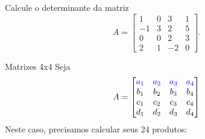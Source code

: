 \begin{frame}{}
\begin{exer}
Calcule o determinante da matriz 
\[
A=\begin{bmatrix}
 1 & 0 & 3 & 1 \\ -1 & 3 & 2 & 5 \\ 	0 & 0 & 2  & 3\\ 2 & 1 & -2 & 0
\end{bmatrix}.
\]
\end{exer}
\end{frame}

\begin{frame}[label=determinantes]{Matrizes 4x4}
Seja
\[
A=\begin{bmatrix}
{\color{blue}a_{1}} &{\color{blue} a_{2}} &  {\color{blue} a_{3}}  &  {\color{blue} a_{4}}\\ 
{\color{black}b_{1}} &{\color{black} b_{2}} &  {\color{black} b_{3}}  &  {\color{black} b_{4}}\\ 
{\color{black}c_{1}} &{\color{black} c_{2}} &  {\color{black} c_{3}}  &  {\color{black} c_{4}}\\
{\color{black}d_{1}} &{\color{black} d_{2}} &  {\color{black} d_{3}}  &  {\color{black} d_{4}}
\end{bmatrix}
\]
Neste caso, precisamos calcular seus 24 produtos:


\end{frame}
